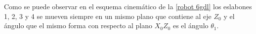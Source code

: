 \documentclass[a4paper,12pt]{article}
\begin{document}
Como se puede observar en el esquema cinemático de la \cref{robot 6gdl} los eslabones
1, 2, 3 y 4 se mueven siempre en un mismo plano que contiene al eje $Z_0$ y el ángulo que
el mismo forma con respecto al plano $X_0Z_0$ es el ángulo $\theta_1$.




\end{document}
